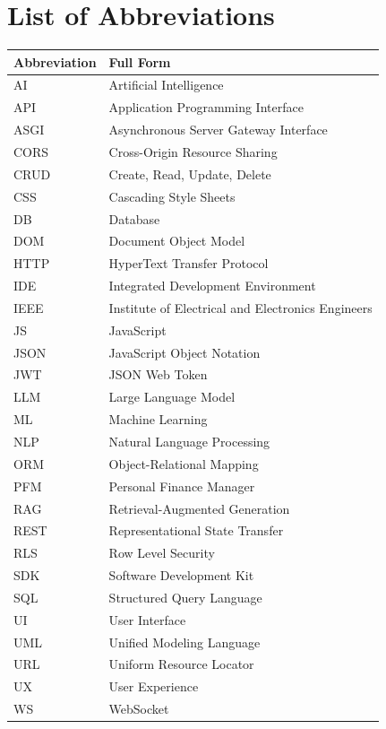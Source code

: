 
\chapter*{List of Abbreviations}

\vspace{1cm}

\begin{longtable}{@{}p{3cm}p{10cm}@{}}
\textbf{Abbreviation} & \textbf{Full Form} \\
\midrule
\endhead

AI & Artificial Intelligence \\
API & Application Programming Interface \\
ASGI & Asynchronous Server Gateway Interface \\
CORS & Cross-Origin Resource Sharing \\
CRUD & Create, Read, Update, Delete \\
CSS & Cascading Style Sheets \\
DB & Database \\
DOM & Document Object Model \\
HTTP & HyperText Transfer Protocol \\
IDE & Integrated Development Environment \\
IEEE & Institute of Electrical and Electronics Engineers \\
JS & JavaScript \\
JSON & JavaScript Object Notation \\
JWT & JSON Web Token \\
LLM & Large Language Model \\
ML & Machine Learning \\
NLP & Natural Language Processing \\
ORM & Object-Relational Mapping \\
PFM & Personal Finance Manager \\
RAG & Retrieval-Augmented Generation \\
REST & Representational State Transfer \\
RLS & Row Level Security \\
SDK & Software Development Kit \\
SQL & Structured Query Language \\
UI & User Interface \\
UML & Unified Modeling Language \\
URL & Uniform Resource Locator \\
UX & User Experience \\
WS & WebSocket \\

\end{longtable}
